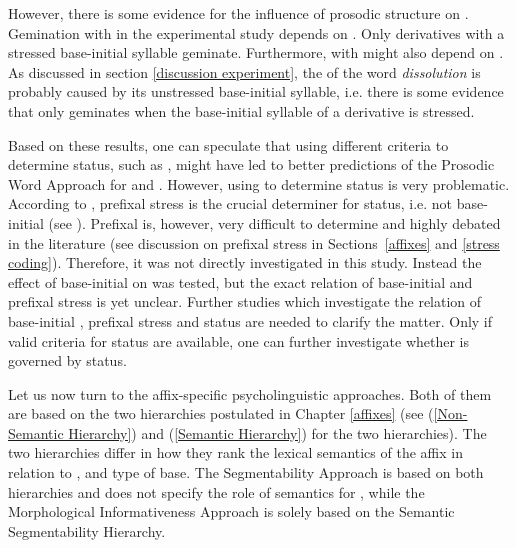 However, there is some evidence 
for the influence of prosodic structure on . 
Gemination with  in the experimental study depends on . Only derivatives with a stressed base-initial syllable geminate. Furthermore,  with  might also depend on . As discussed in section  \ref{discussion experiment}, the  of the word \textit{dissolution} is probably caused by its unstressed base-initial syllable, i.e. there is some evidence that  only geminates when the base-initial syllable of a derivative is stressed. 

Based on these results, one can speculate that using different criteria to determine  status, such as , might have led to better predictions of the Prosodic Word Approach for  and . 
However, using  to determine  status is very problematic. %
 According to \cite{Raffelsiefen.1999}, prefixal stress is the crucial determiner for  status, i.e. not base-initial  (see ). Prefixal  is, however, very difficult to determine and highly debated in the literature (see discussion on prefixal stress in Sections~\ref{affixes} and \ref{stress coding}). Therefore, it was not directly investigated in this study. Instead the effect of base-initial  on  was tested, but the exact relation of base-initial  and prefixal stress is yet unclear.
Further studies which investigate the relation of base-initial , prefixal stress and  status are needed to clarify the matter. Only if valid criteria for  status are available, one can further investigate whether  is governed by  status. 

 




Let us now turn to the affix-specific psycholinguistic approaches. Both of them are based on the two  hierarchies postulated in Chapter \ref{affixes} (see  (\ref{Non-Semantic Hierarchy})  and (\ref{Semantic Hierarchy}) for the two hierarchies).
The two hierarchies differ in how they rank the lexical semantics of the affix in relation to ,  and type of base. The Segmentability Approach is based on both hierarchies and does not specify the role of semantics for , while the Morphological Informativeness Approach is solely based on the Semantic Segmentability Hierarchy.%

